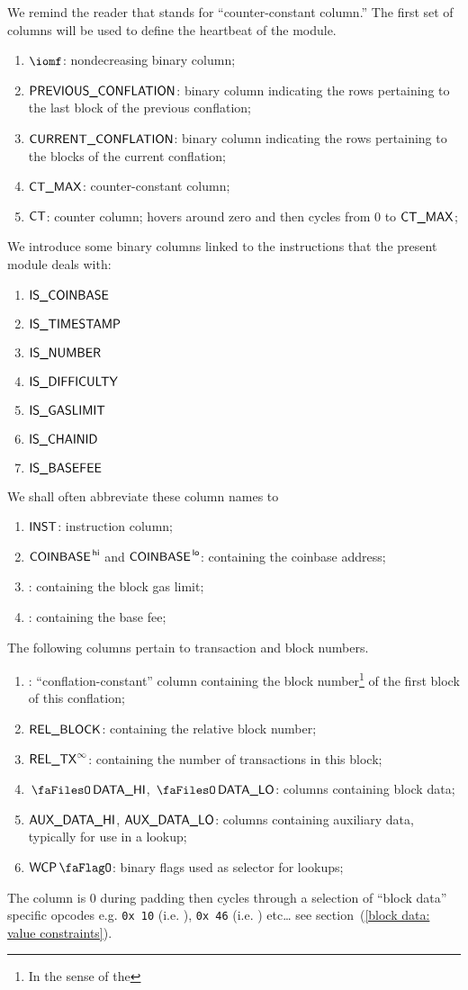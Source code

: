 We remind the reader that \ccc{} stands for ``counter-constant column.''
The first set of columns will be used to define the heartbeat of the \btcMod{} module.
\begin{enumerate}
	\item $\iomf$:
		nondecreasing binary column;
	\item $\textsf{PREVIOUS\_CONFLATION}$:
		binary column indicating the rows pertaining to the last block of the previous conflation;
	\item $\textsf{CURRENT\_CONFLATION}$:
		binary column indicating the rows pertaining to the blocks of the current conflation;
	\item $\textsf{CT\_MAX}$:
		counter-constant column;
	\item $\textsf{CT}$:
		counter column; hovers around zero and then cycles from $0$ to $\textsf{CT\_MAX}$;
\end{enumerate}
We introduce some binary columns linked to the instructions that the present module deals with:
\begin{multicols}{3}
	\begin{enumerate}[resume]
		\item $\textsf{IS\_COINBASE}$    
		\item $\textsf{IS\_TIMESTAMP}$   
		\item $\textsf{IS\_NUMBER}$      
		\item $\textsf{IS\_DIFFICULTY}$  
		\item $\textsf{IS\_GASLIMIT}$    
		\item $\textsf{IS\_CHAINID}$     
		\item $\textsf{IS\_BASEFEE}$     
	\end{enumerate} 
\end{multicols}
We shall often abbreviate these column names to
\begin{enumerate}[resume]
	\item $\textsf{INST}$:
		instruction column;
	\item $\textsf{COINBASE}^{\mathsf{\,hi}}$ and $\textsf{COINBASE}^{\mathsf{\,lo}}$:
		\ccc{} containing the
		coinbase address;
	\item \blockGasLimit{}:
		\ccc{} containing the
		block gas limit;
	\item \basefee{}:
		\ccc{} containing the
		base fee;
\end{enumerate}
The following columns pertain to transaction and block numbers.
\begin{enumerate}[resume]
	\item \blockNumberOfFirstBlockInConflation{}:
		``conflation-constant'' column containing the block number\footnote{In the sense of the \evm{}} of the first block of this conflation;
	\item $\textsf{REL\_BLOCK}$:
		\ccc{} containing the relative block number;
	\item $\textsf{REL\_TX}^\infty$:
		\ccc{} containing the number of transactions in this block;
	\item $\blockDataHi$, $\blockDataLo$:
		columns containing block data;
	\item $\textsf{AUX\_DATA\_HI}$, $\textsf{AUX\_DATA\_LO}$:
		columns containing auxiliary data, typically for use in a lookup;
	\item $\wcpFlag$:
		binary flags used as selector for lookups;
\end{enumerate}
\saNote{}
The \INST{} column is $0$ during padding then cycles through a selection of ``block data'' specific opcodes e.g. \texttt{0x\,10} (i.e. ), \texttt{0x\,46} (i.e. ) etc\dots{} see section~(\ref{block data: value constraints}).
